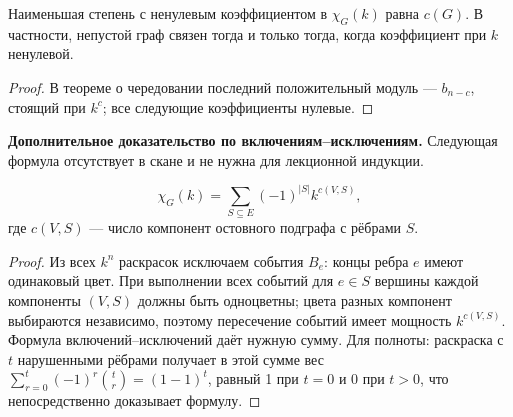 

\begin{cor}
Наименьшая степень с ненулевым коэффициентом в \(\chi_G(k)\) равна \(c(G)\).
В частности, непустой граф связен тогда и только тогда,
когда коэффициент при \(k\) ненулевой.
\end{cor}
\begin{proof}
В теореме о чередовании последний положительный модуль — \(b_{n-c}\),
стоящий при \(k^c\); все следующие коэффициенты нулевые.
\end{proof}
\textbf{Дополнительное доказательство по включениям–исключениям.}
Следующая формула отсутствует в скане и не нужна для лекционной индукции.
\begin{lemma}
\[
 \chi_G(k)=\sum_{S\subseteq E}(-1)^{|S|}k^{c(V,S)},
\]
где \(c(V,S)\) — число компонент остовного подграфа с рёбрами \(S\).
\end{lemma}
\begin{proof}
Из всех \(k^n\) раскрасок исключаем события \(B_e\): концы ребра \(e\)
имеют одинаковый цвет. При выполнении всех событий для \(e\in S\)
вершины каждой компоненты \((V,S)\) должны быть одноцветны; цвета
разных компонент выбираются независимо, поэтому пересечение событий
имеет мощность \(k^{c(V,S)}\). Формула включений–исключений даёт нужную сумму.
Для полноты: раскраска с \(t\) нарушенными рёбрами получает в этой сумме
вес \(\sum_{r=0}^t(-1)^r\binom tr=(1-1)^t\), равный 1 при \(t=0\)
и 0 при \(t>0\), что непосредственно доказывает формулу.
\end{proof}


